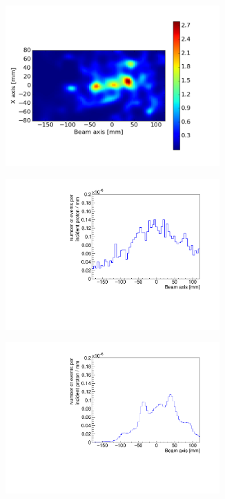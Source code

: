 \begin{figure}
\centering
 \begin{subfigure}[t]{.49\textwidth}
 \includegraphics[width=0.9\textwidth,clip=true,trim=0 70 130 90]{03_GraphicFiles/chapter4_HTsimu/projection2D_Z_corr_r20.png}
 \caption{}
 \label{}
\end{subfigure}
 \begin{subfigure}[t]{.49\textwidth}
\includegraphics[width=0.9\textwidth]{03_GraphicFiles/chapter4_HTsimu/new/recon_profile_line-cone_lowStat_norm.pdf}
 \caption{}
 \label{}
\end{subfigure}
 \begin{subfigure}[t]{.49\textwidth}
\includegraphics[width=0.9\textwidth]{03_GraphicFiles/chapter4_HTsimu/new/reconstructed_lowStat_profile_norm.pdf}

\end{subfigure}
\end{figure}
